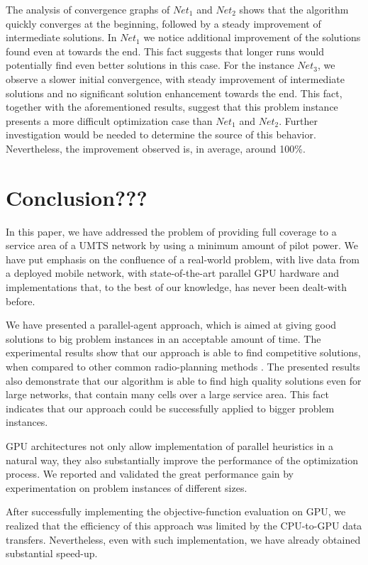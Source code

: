 The analysis of convergence graphs of $Net_{1}$ and $Net_{2}$ shows
that the algorithm quickly converges at the beginning, followed by
a steady improvement of intermediate solutions. In $Net_{1}$ we notice
additional improvement of the solutions found even at towards the
end. This fact suggests that longer runs would potentially find even
better solutions in this case. For the instance $Net_{3}$, we observe
a slower initial convergence, with steady improvement of intermediate
solutions and no significant solution enhancement towards the end.
This fact, together with the aforementioned results, suggest that
this problem instance presents a more difficult optimization case
than $Net_{1}$ and $Net_{2}$. Further investigation would be needed
to determine the source of this behavior. Nevertheless, the improvement
observed is, in average, around 100\%.


\section{Conclusion???}

In this paper, we have addressed the problem of providing full coverage
to a service area of a UMTS network by using a minimum amount of pilot
power. We have put emphasis on the confluence of a real-world problem,
with live data from a deployed mobile network, with state-of-the-art
parallel GPU hardware and implementations that, to the best of our
knowledge, has never been dealt-with before.

We have presented a parallel-agent approach, which is aimed at giving
good solutions to big problem instances in an acceptable amount of
time. The experimental results show that our approach is able to find
competitive solutions, when compared to other common radio-planning
methods \cite{Holma_WCDMA.for.UMTS:2005}. The presented results also
demonstrate that our algorithm is able to find high quality solutions
even for large networks, that contain many cells over a large service
area. This fact indicates that our approach could be successfully
applied to bigger problem instances.

GPU architectures not only allow implementation of parallel heuristics
in a natural way, they also substantially improve the performance
of the optimization process. We reported and validated the great performance
gain by experimentation on problem instances of different sizes.

After successfully implementing the objective-function evaluation
on GPU, we realized that the efficiency of this approach was limited
by the CPU-to-GPU data transfers. Nevertheless, even with such implementation,
we have already obtained substantial speed-up.

